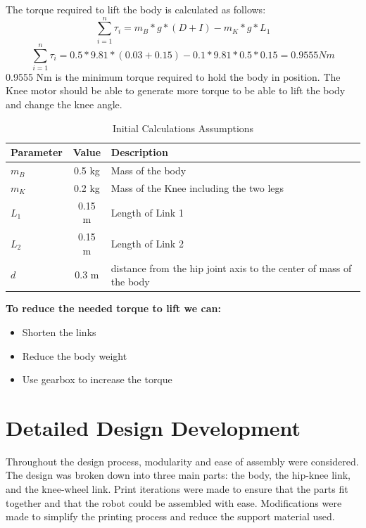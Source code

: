 The torque required to lift the body is calculated as follows:
\begin{equation}
	\sum_{i=1}^{n} \tau_{i}=m_{B}*g*(D+I)-m_{K}*g*L_{1}
\end{equation}
\begin{equation}
	\sum_{i=1}^{n} \tau_{i}=0.5*9.81*(0.03+0.15)-0.1*9.81*0.5*0.15=0.9555 Nm
\end{equation}
0.9555 Nm is the minimum torque required to hold the body in position.
The Knee motor should be able to generate more torque to be able to lift the body and change the knee angle.

\begin{table}[h]
	\centering
	\caption{Initial Calculations Assumptions}
	\label{tab:initialcalculationsassumptions}
	\begin{tabular}{lcl}
		\toprule
		Parameter & Value & Description 			  \\
		\midrule
		$m_B$         & 0.5 kg  & Mass of the body  \\
		$m_K$         & 0.2 kg  & Mass of the Knee including the two legs\\
		$L_1$         & 0.15 m   & Length of Link 1  \\
		$L_2$         & 0.15 m   & Length of Link 2   \\
		$d$ 	  	  & 0.3 m   & distance from the hip joint axis to the center of mass of the body   \\
		\bottomrule
	\end{tabular}
\end{table}

\begin{notebox}
	\textbf{To reduce the needed torque to lift we can:}
	\begin{itemize}
		\item Shorten the links
		\item Reduce the body weight
		\item Use gearbox to increase the torque
	\end{itemize}
\end{notebox}
\newpage
\section{Detailed Design Development}
Throughout the design process, modularity and ease of assembly were considered.
The design was broken down into three main parts: the body, the hip-knee link, and the knee-wheel link.
Print iterations were made to ensure that the parts fit together and that the robot could be assembled with ease. Modifications were made to simplify the printing process and reduce the support material used.


